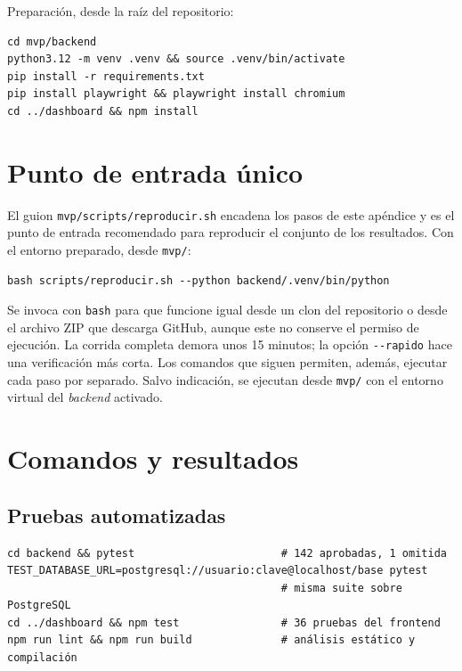 Preparación, desde la raíz del repositorio:

\begin{footnotesize}
\begin{verbatim}
cd mvp/backend
python3.12 -m venv .venv && source .venv/bin/activate
pip install -r requirements.txt
pip install playwright && playwright install chromium
cd ../dashboard && npm install
\end{verbatim}
\end{footnotesize}

\section{Punto de entrada único}
\label{sec:repro_entrada}

El guion \texttt{mvp/scripts/reproducir.sh} encadena los pasos de este apéndice y es el punto de entrada recomendado para reproducir el conjunto de los resultados. Con el entorno preparado, desde \texttt{mvp/}:

\begin{footnotesize}
\begin{verbatim}
bash scripts/reproducir.sh --python backend/.venv/bin/python
\end{verbatim}
\end{footnotesize}

\noindent Se invoca con \texttt{bash} para que funcione igual desde un clon del repositorio o desde el archivo ZIP que descarga GitHub, aunque este no conserve el permiso de ejecución. La corrida completa demora unos 15 minutos; la opción \verb|--rapido| hace una verificación más corta. Los comandos que siguen permiten, además, ejecutar cada paso por separado. Salvo indicación, se ejecutan desde \texttt{mvp/} con el entorno virtual del \textit{backend} activado.

\section{Comandos y resultados}

\subsection{Pruebas automatizadas}

\begin{footnotesize}
\begin{verbatim}
cd backend && pytest                       # 142 aprobadas, 1 omitida
TEST_DATABASE_URL=postgresql://usuario:clave@localhost/base pytest
                                           # misma suite sobre PostgreSQL
cd ../dashboard && npm test                # 36 pruebas del frontend
npm run lint && npm run build              # análisis estático y compilación
\end{verbatim}
\end{footnotesize}

